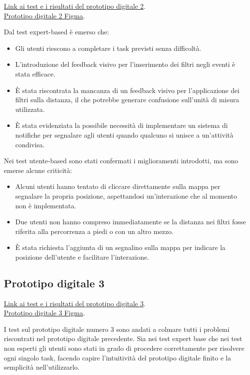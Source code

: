 \href{https://docs.google.com/document/d/14B2WcuVyL4053sf5h5g5lDa-m5fLmWLRVHaaozB6VmI/edit?tab=t.0#heading=h.v3zfp3tumtu5}{Link ai test e i risultati del prototipo digitale 2}.\\
\href{https://www.figma.com/files/project/321365683}{Prototipo digitale 2 Figma}.

Dal test expert-based è emerso che:
\begin{itemize}
    \item Gli utenti riescono a completare i task previsti senza difficoltà.
    \item L’introduzione del feedback visivo per l’inserimento dei filtri negli eventi è stata efficace.
    \item È stata riscontrata la mancanza di un feedback visivo per l’applicazione dei filtri sulla distanza, il che potrebbe generare confusione sull’unità di misura utilizzata.
    \item È stata evidenziata la possibile necessità di implementare un sistema di notifiche per segnalare agli utenti quando qualcuno si unisce a un’attività condivisa.
\end{itemize}
Nei test utente-based sono stati confermati i miglioramenti introdotti, ma sono emerse alcune criticità:
\begin{itemize}
    \item Alcuni utenti hanno tentato di cliccare direttamente sulla mappa per segnalare la propria posizione, aspettandosi un’interazione che al momento non è implementata.
    \item Due utenti non hanno compreso immediatamente se la distanza nei filtri fosse riferita alla percorrenza a piedi o con un altro mezzo.
    \item È stata richiesta l’aggiunta di un segnalino sulla mappa per indicare la posizione dell’utente e facilitare l’interazione.
\end{itemize}

\subsection{Prototipo digitale 3}
\href{https://docs.google.com/document/d/15gM4u7e1iwK6NzTnSJ2TVb7U_66R-ykh94UbGy8O2V0/edit?tab=t.0}{Link ai test e i risultati del prototipo digitale 3}.\\
\href{https://www.figma.com/files/project/321365683}{Prototipo digitale 3 Figma}.

I test sul prototipo digitale numero 3 sono andati a colmare tutti i problemi riscontrati nel prototipo digitale precedente.
Sia nei test expert base che nei test non esperti gli utenti sono stati in grado di procedere correttamente per risolvere ogni singolo task, facendo capire l’intuitività del prototipo digitale finito e la semplicità nell’utilizzarlo.